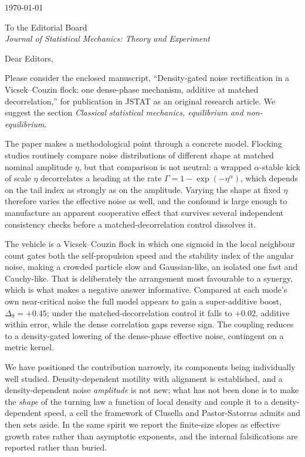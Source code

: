 \documentclass[11pt,a4paper]{article}
\begin{document}
\hfill\today

\medskip

To the Editorial Board\\
\emph{Journal of Statistical Mechanics: Theory and Experiment}

\medskip

Dear Editors,

Please consider the enclosed manuscript, ``Density-gated noise
rectification in a Vicsek--Couzin flock: one dense-phase mechanism,
additive at matched decorrelation,'' for publication in JSTAT as an
original research article. We suggest the section \emph{Classical
statistical mechanics, equilibrium and non-equilibrium}.

The paper makes a methodological point through a concrete model.
Flocking studies routinely compare noise distributions of different
shape at matched nominal amplitude $\eta$, but that comparison is not
neutral: a wrapped $\alpha$-stable kick of scale $\eta$ decorrelates a
heading at the rate $\Gamma = 1 - \exp(-\eta^{\alpha})$, which depends
on the tail index as strongly as on the amplitude. Varying the shape at
fixed $\eta$ therefore varies the effective noise as well, and the
confound is large enough to manufacture an apparent cooperative effect
that survives several independent consistency checks before a
matched-decorrelation control dissolves it.

The vehicle is a Vicsek--Couzin flock in which one sigmoid in the local
neighbour count gates both the self-propulsion speed and the stability
index of the angular noise, making a crowded particle slow and
Gaussian-like, an isolated one fast and Cauchy-like. That is
deliberately the arrangement most favourable to a synergy, which is
what makes a negative answer informative. Compared at each mode's own
near-critical noise the full model appears to gain a super-additive
boost, $\Delta_9 = +0.45$; under the matched-decorrelation control it
falls to $+0.02$, additive within error, while the dense correlation
gaps reverse sign. The coupling reduces to a density-gated lowering of
the dense-phase effective noise, contingent on a metric kernel.

We have positioned the contribution narrowly, its components being
individually well studied. Density-dependent motility with alignment is
established, and a density-dependent noise \emph{amplitude} is not new;
what has not been done is to make the \emph{shape} of the turning law a
function of local density and couple it to a density-dependent speed, a
cell the framework of Clusella and Pastor-Satorras admits and then sets
aside. In the same spirit we report the finite-size slopes as effective
growth rates rather than asymptotic exponents, and the internal
falsifications are reported rather than buried.
\end{document}
